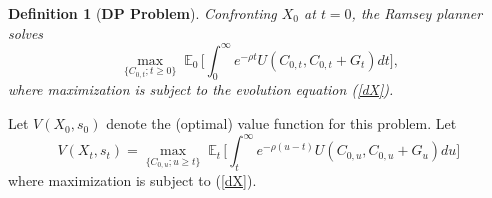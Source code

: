\documentclass[12pt]{article}
\newtheorem{definition}{Definition}
\newcommand{\NW}[1]{{\textcolor{blue}{#1}}}
\begin{document}
\begin{definition} [{\bf  DP Problem}] \label{definDP}
	Confronting  $X_0$ at $t=0$, 
	the Ramsey planner  solves 
	\begin{equation}\label{continuation_obj}
		\max_{\{C_{0, t}; t\geq 0 \}}\; 
		\mathbb{E}_0 \,\bigg[\int_{0}^{\infty} e^{-\rho t} U({C}_{0, t}, {C}_{0, t}+G_t) d t  \bigg],
	\end{equation}
	where maximization is subject to the evolution equation  (\ref{dX}). %
\end{definition} 
%
Let $V(X_0, s_0)$ denote the (optimal) value function for this problem. %
Let
\begin{equation}\label{Vcontinue}
V(X_t, s_t) =	\max_{\{C_{0, u}; u\geq t \}}\; 
	\mathbb{E}_t	\, \bigg[\int_t^{\infty} e^{-\rho(u-t)} U({C}_{0, u}, {C}_{0, u}+G_u) d u \bigg] \,  
\end{equation}
where maximization is subject to (\ref{dX}).
%
\end{document}
